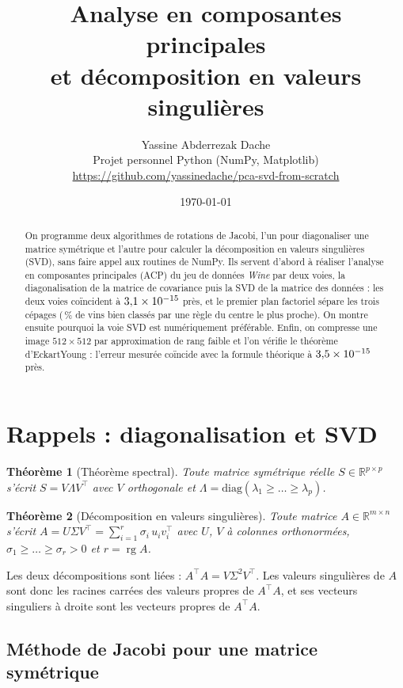 \documentclass[11pt,a4paper]{article}
\title{\textbf{Analyse en composantes principales\\ et décomposition en valeurs singulières}}
\author{Yassine Abderrezak Dache\\[2pt]\small Projet personnel \textendash{} Python (NumPy, Matplotlib)\\[1pt]\small\url{https://github.com/yassinedache/pca-svd-from-scratch}}
\date{\today}
\newtheorem{theoreme}{Théorème}
\theoremstyle{remark}
\newcommand{\R}{\mathbb{R}}
\DeclareMathOperator{\rg}{rg}
\begin{document}
\maketitle

\begin{abstract}
On programme deux algorithmes de rotations de Jacobi, l'un pour diagonaliser une matrice symétrique et l'autre pour calculer la décomposition en valeurs singulières (SVD), sans faire appel aux routines de NumPy. Ils servent d'abord à réaliser l'analyse en composantes principales (ACP) du jeu de données \emph{Wine} par deux voies, la diagonalisation de la matrice de covariance puis la SVD de la matrice des données : les deux voies coïncident à $3{,}1 \times 10^{-15}$ près, et le premier plan factoriel sépare les trois cépages (\nccAcc\,\% de vins bien classés par une règle du centre le plus proche). On montre ensuite pourquoi la voie SVD est numériquement préférable. Enfin, on compresse une image $512 \times 512$ par approximation de rang faible et l'on vérifie le théorème d'Eckart\textendash Young : l'erreur mesurée coïncide avec la formule théorique à $3{,}5 \times 10^{-15}$ près.
\end{abstract}

\section{Rappels : diagonalisation et SVD}

\begin{theoreme}[Théorème spectral]
Toute matrice symétrique réelle $S \in \R^{p\times p}$ s'écrit $S = V \Lambda V^\top$ avec $V$ orthogonale et $\Lambda = \mathrm{diag}(\lambda_1 \ge \dots \ge \lambda_p)$.
\end{theoreme}

\begin{theoreme}[Décomposition en valeurs singulières]
Toute matrice $A \in \R^{m \times n}$ s'écrit $A = U \Sigma V^\top = \sum_{i=1}^{r} \sigma_i\, u_i v_i^\top$ avec $U$, $V$ à colonnes orthonormées, $\sigma_1 \ge \dots \ge \sigma_r > 0$ et $r = \rg A$.
\end{theoreme}

Les deux décompositions sont liées : $A^\top A = V \Sigma^2 V^\top$. Les valeurs singulières de $A$ sont donc les racines carrées des valeurs propres de $A^\top A$, et ses vecteurs singuliers à droite sont les vecteurs propres de $A^\top A$.

\subsection{Méthode de Jacobi pour une matrice symétrique}
\end{document}
